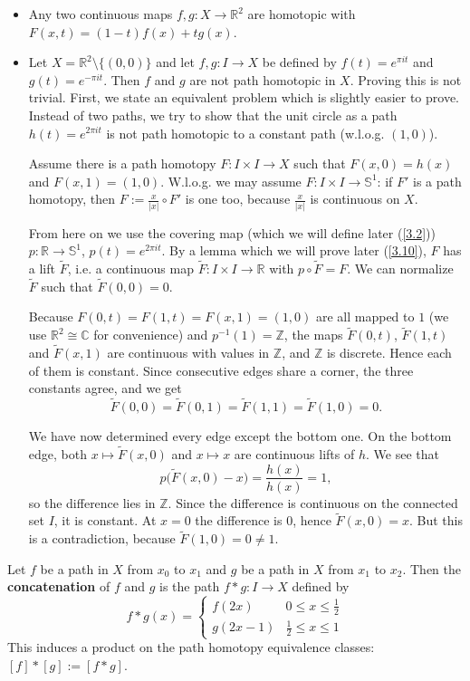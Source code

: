 \begin{example}\label{2.4}
    \leavevmode
    \begin{itemize}
        \item Any two continuous maps $f,g:X \to \mathbb{R}^2$ are homotopic with $F(x,t)=(1-t)f(x)+tg(x)$.
        \item Let $X=\mathbb{R}^2\setminus \{(0,0)\}$ and let $f,g:I\to X$ be defined by $f(t)=e^{\pi i t}$ and $g(t)=e^{-\pi i t}$. Then $f$ and $g$ are not path homotopic in $X$. Proving this is not trivial. First, we state an equivalent problem which is slightly easier to prove. Instead of two paths, we try to show that the unit circle as a path $h(t)=e^{2\pi i t}$ is not path homotopic to a constant path (w.l.o.g. $(1,0)$).

Assume there is a path homotopy $F:I\times I\to X$ such that $F(x,0)=h(x)$ and $F(x,1)=(1,0)$. W.l.o.g. we may assume $F:I\times I\to \mathbb{S}^1$: if $F'$ is a path homotopy, then $F:=\frac{x}{|x|}\circ F'$ is one too, because $\frac{x}{|x|}$ is continuous on $X$.

From here on we use the covering map (which we will define later (\ref{3.2})) $p:\mathbb{R}\to \mathbb{S}^1$, $p(t)=e^{2\pi i t}$. By a lemma which we will prove later (\ref{3.10}), $F$ has a lift $\tilde F$, i.e. a continuous map $\tilde F:I\times I\to\mathbb{R}$ with $p\circ\tilde F=F$. We can normalize $\tilde F$ such that $\tilde F(0,0)=0$.

Because $F(0,t)=F(1,t)=F(x,1)=(1,0)$ are all mapped to $1$ (we use $\mathbb{R}^2 \cong \mathbb{C}$ for convenience) and $p^{-1}(1)=\mathbb{Z}$, the maps $\tilde F(0,t)$, $\tilde F(1,t)$ and $\tilde F(x,1)$ are continuous with values in $\mathbb{Z}$, and $\mathbb{Z}$ is discrete. Hence each of them is constant. Since consecutive edges share a corner, the three constants agree, and we get
$$\tilde F(0,0)=\tilde F(0,1)=\tilde F(1,1)=\tilde F(1,0)=0.$$

We have now determined every edge except the bottom one. On the bottom edge, both $x\mapsto \tilde F(x,0)$ and $x\mapsto x$ are continuous lifts of $h$. We see that
$$p\big(\tilde F(x,0)-x\big)=\frac{h(x)}{h(x)}=1,$$
so the difference lies in $\mathbb{Z}$. Since the difference is continuous on the connected set $I$, it is constant. At $x=0$ the difference is $0$, hence $\tilde F(x,0)=x$. But this is a contradiction, because $\tilde F(1,0)=0\neq 1$.
    \end{itemize}
\end{example}
\begin{definition}\label{2.5}
    Let $f$ be a path in $X$ from $x_0$ to $x_1$ and $g$ be a path in $X$ from $x_1$ to $x_2$. Then the \textbf{concatenation} of $f$ and $g$ is the path $f*g:I\to X$ defined by \[f*g(x)=\begin{cases}
        f(2x) & 0\leq x\leq \frac{1}{2}\\
        g(2x-1) & \frac{1}{2}\leq x\leq 1 
    \end{cases}\]
    This induces a product on the path homotopy equivalence classes: $[f]*[g]:=[f*g]$.
\end{definition}
